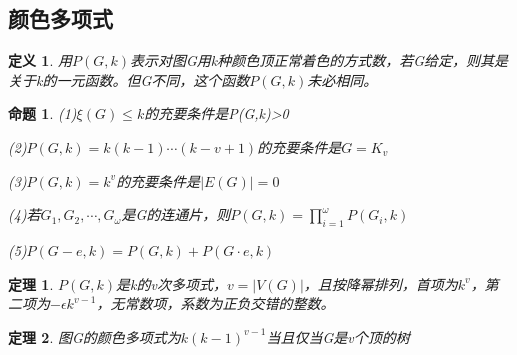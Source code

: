 \documentclass[UTF8]{ctexart}
\newtheorem{dfnt}{定义}
\newtheorem{thr}{定理}
\newtheorem{pro}{命题}
\begin{document}
\subsection{颜色多项式}
\begin{dfnt}
用$P(G,k)$表示对图G用k种颜色顶正常着色的方式数，若G给定，则其是关于k的一元函数。但G不同，这个函数$P(G,k)$未必相同。
\end{dfnt}
\begin{pro}
\item (1)$\xi (G)\leq k$的充要条件是P(G,k)>0
\item (2)$P(G,k)=k(k-1)\cdots (k-v+1)$的充要条件是$G = K_v$
\item (3)$P(G,k)=k^v$的充要条件是$|E(G)|=0$
\item (4)若$G_1,G_2,\cdots,G_{\omega}$是G的连通片，则$P(G,k)=\prod \limits_{i=1}^{\omega}P(G_i,k)$
\item (5)$P(G-e,k)=P(G,k)+P(G\cdot e,k)$
\end{pro}
\begin{thr}
$P(G,k)$是k的v次多项式，$v=|V(G)|$，且按降幂排列，首项为$k^v$，第二项为$-\epsilon k^{v-1}$，无常数项，系数为正负交错的整数。
\end{thr}
\begin{thr}
图G的颜色多项式为$k(k-1)^{v-1}$当且仅当G是v个顶的树
\end{thr}
\end{document}
